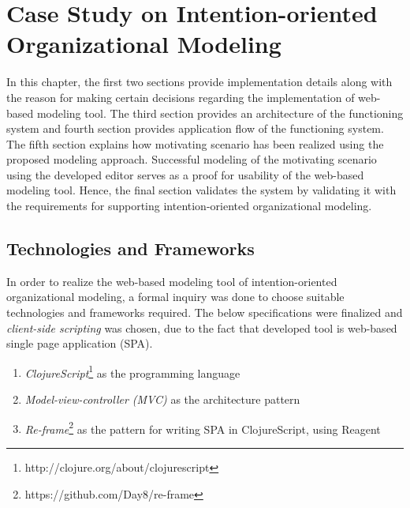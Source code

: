 \chapter{Case Study on Intention-oriented Organizational Modeling}
\label{chap:casestudy}

In this chapter, the first two sections provide implementation details along with the reason for making certain decisions regarding the implementation of web-based modeling tool. The third section provides an architecture of the functioning system and fourth section provides application flow of the functioning system. The fifth section explains how motivating scenario has been realized using the proposed modeling approach. Successful modeling of the motivating scenario using the developed editor serves as a proof for usability of the web-based modeling tool. Hence, the final section validates the system by validating it with the requirements for supporting intention-oriented organizational modeling. 

\section{Technologies and Frameworks}
\label{subsec:specifications}
In order to realize the web-based modeling tool of intention-oriented organizational modeling, a formal inquiry was done to choose suitable technologies and frameworks required. The below specifications were finalized and \textit{client-side scripting} \cite{Sierra2012} was chosen, due to the fact that developed tool is web-based single page application (SPA). 

\begin{enumerate}   
	\item \textit{ClojureScript}\footnote{http://clojure.org/about/clojurescript} as the programming language
	\item \textit{Model-view-controller (MVC)} \cite{Deacon2009}  as the architecture pattern
	\item \textit{Re-frame}\footnote{https://github.com/Day8/re-frame} as the pattern for writing SPA \cite{Mikowski2013} in ClojureScript, using Reagent	
\end{enumerate}

